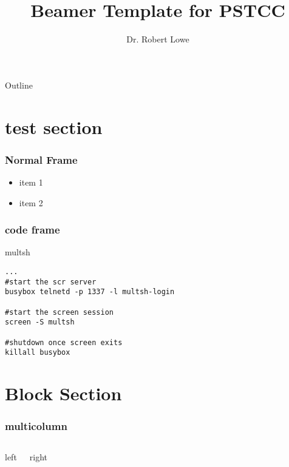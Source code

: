 \documentclass{beamer}
\title{Beamer Template for PSTCC}
\author{Dr. Robert Lowe\\}
\institute[Pellissippi State Community College] %
{
  Department of Computer Information Technology
  Pellissippi State Community College
}
\date[]{}
\begin{document}
\begin{frame}
  \titlepage
\end{frame}

\begin{frame}{Outline}
  \tableofcontents
\end{frame}





\section{test section}
\begin{frame}
  \frametitle{Normal Frame}
  \begin{itemize}
    \item item 1
    \item item 2
  \end{itemize}
\end{frame}


\begin{frame}[fragile]
  \frametitle{code frame}
  \begin{block}{multsh}
\begin{verbatim}
...
#start the scr server
busybox telnetd -p 1337 -l multsh-login

#start the screen session
screen -S multsh

#shutdown once screen exits
killall busybox
\end{verbatim}
  \end{block}
\end{frame}

\section{Block Section}
\begin{frame}
  \frametitle{multicolumn}
  \begin{columns}
  \begin{block}{left}
  \end{block}
  \begin{block}{right}
  \end{block}
  \end{columns}
\end{frame}
\end{document}

